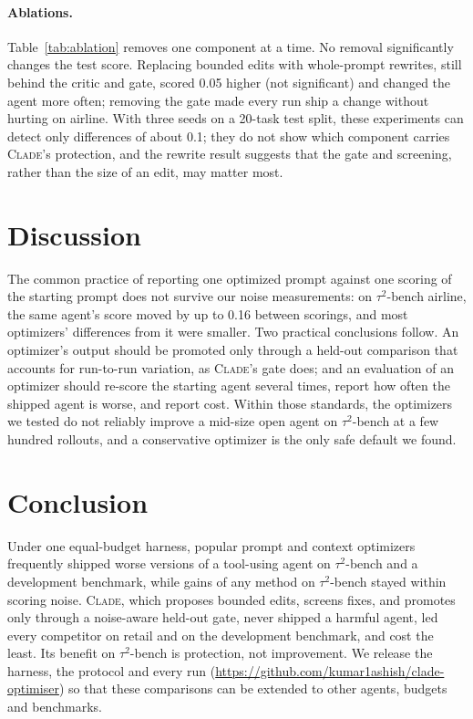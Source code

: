 \documentclass[11pt]{article}
\newcommand{\clade}{\textsc{Clade}\xspace}
\newcommand{\taub}{$\tau^2$-bench\xspace}
\begin{document}
\paragraph{Ablations.} Table~\ref{tab:ablation} removes one component at a time. No removal significantly changes
the test score. Replacing bounded edits with whole-prompt rewrites, still behind the critic and gate, scored 0.05
higher (not significant) and changed the agent more often; removing the gate made every run ship a change without
hurting on airline. With three seeds on a 20-task test split, these experiments can detect only differences of about
0.1; they do not show which component carries \clade's protection, and the rewrite result suggests that the gate
and screening, rather than the size of an edit, may matter most.

\section{Discussion}

The common practice of reporting one optimized prompt against one scoring of the starting prompt does not survive
our noise measurements: on \taub airline, the same agent's score moved by up to 0.16 between scorings, and most
optimizers' differences from it were smaller. Two practical conclusions follow. An optimizer's output should be
promoted only through a held-out comparison that accounts for run-to-run variation, as \clade's gate does; and an
evaluation of an optimizer should re-score the starting agent several times, report how often the shipped agent is
worse, and report cost. Within those standards, the optimizers we tested do not reliably improve a mid-size open
agent on \taub at a few hundred rollouts, and a conservative optimizer is the only safe default we found.

\section{Conclusion}

Under one equal-budget harness, popular prompt and context optimizers frequently shipped worse versions of a
tool-using agent on \taub and a development benchmark, while gains of any method on \taub stayed within scoring noise.
\clade, which proposes bounded edits, screens fixes, and promotes only through a noise-aware held-out gate, never
shipped a harmful agent, led every competitor on retail and on the development benchmark, and cost the least. Its
benefit on \taub is protection, not improvement. We release the harness, the protocol and every run\ifdefined\preprintmode{}
(\url{https://github.com/kumar1ashish/clade-optimiser})\fi{} so that these
comparisons can be extended to other agents, budgets and benchmarks.
\end{document}
